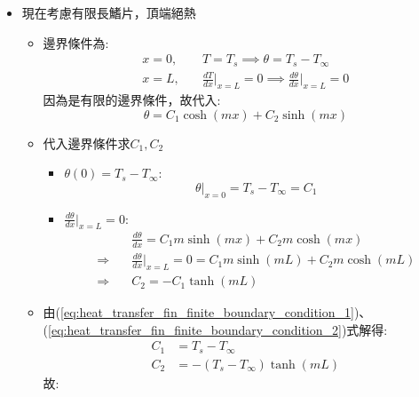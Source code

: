 \documentclass[../main.tex]{subfiles}
\begin{document}
\begin{itemize}
\begin{itemize}
\begin{itemize}
\begin{align}
        &= \frac{\sqrt{hPkA_c}}{h P L} \nonumber\\
        &= \boxed{\frac{1}{L} \sqrt{\frac{kA_c}{hP}}} \label{eq:heat_transfer_fin_infinite_efficiency}
      \end{align}
    \end{itemize}
    \item 現在考慮有限長鰭片，頂端絕熱
    \begin{itemize}
      \item 邊界條件為:
      \begin{align}
        x=0,&\quad T=T_s \implies \theta = T_s - T_\infty \nonumber\\
        x=L,&\quad \frac{dT}{dx}\bigg|_{x=L} = 0 \implies \frac{d\theta}{dx}\bigg|_{x=L} = 0
      \end{align}
      因為是有限的邊界條件，故代入:
      \begin{equation}
        \theta = C_1 \cosh(mx) + C_2 \sinh(mx)
      \end{equation}
      \item 代入邊界條件求$C_1, C_2$
      \begin{itemize}
        \item $\theta(0)=T_s - T_\infty$:
        \begin{equation}
          \theta|_{x=0} = T_s - T_\infty = C_1 \label{eq:heat_transfer_fin_finite_boundary_condition_1}
        \end{equation}
        \item $\frac{d\theta}{dx}\bigg|_{x=L} = 0$:
        \begin{align}
          & \frac{d\theta}{dx} = C_1 m \sinh(mx) + C_2 m \cosh(mx) \nonumber\\
          \Rightarrow\quad& \frac{d\theta}{dx}\bigg|_{x=L} = 0 = C_1 m \sinh(mL) + C_2 m \cosh(mL) \nonumber\\
          \Rightarrow\quad& C_2 = -C_1 \tanh(mL) \label{eq:heat_transfer_fin_finite_boundary_condition_2}
        \end{align}
      \end{itemize}
      \item 由(\ref{eq:heat_transfer_fin_finite_boundary_condition_1})、(\ref{eq:heat_transfer_fin_finite_boundary_condition_2})式解得:
      \begin{align}
        C_1 &= T_s - T_\infty \nonumber\\
        C_2 &= -(T_s - T_\infty) \tanh(mL)
      \end{align}
      故:
      \begin{equation}

\end{equation}
\end{itemize}
\end{itemize}
\end{itemize}
\end{document}
